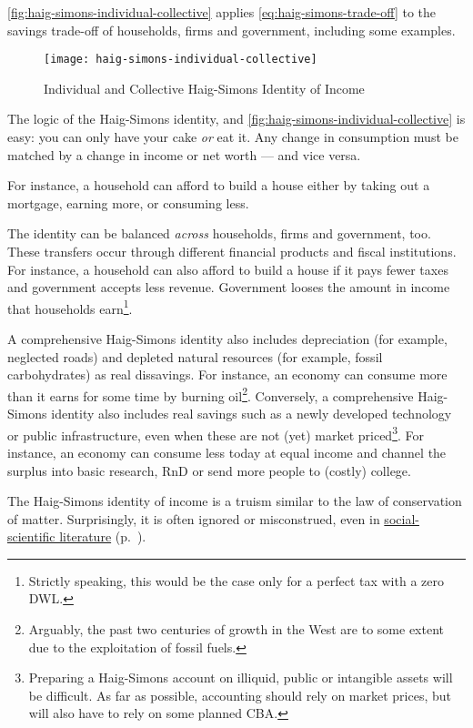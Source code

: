 \autoref{fig:haig-simons-individual-collective} applies \autoref{eq:haig-simons-trade-off} to the savings trade-off of households, firms and government, including some examples. 

\begin{figure}[htbp]
	\centering
	\texttt{[image: haig-simons-individual-collective]}  
	\caption{Individual and Collective Haig-Simons Identity of Income}
	\label{fig:haig-simons-individual-collective} %
\end{figure}

The logic of the Haig-Simons identity, and \autoref{fig:haig-simons-individual-collective} is easy: you can only have your cake \emph{or} eat it. Any change in consumption must be matched by a change in income or net worth --- and vice versa. 

For instance, a household can afford to build a house either by taking out a mortgage, earning more, or consuming less. 

The identity can be balanced \emph{across} households, firms and government, too. These transfers occur through different financial products and fiscal institutions. For instance, a household can also afford to build a house if it pays fewer taxes and government accepts less revenue. Government looses the amount in income that households earn\footnote{
	Strictly speaking, this would be the case only for a perfect tax with a zero \gls{DWL}.}. 

A comprehensive Haig-Simons identity also includes depreciation (for example, neglected roads) and depleted natural resources (for example, fossil carbohydrates) as real dissavings. For instance, an economy can consume more than it earns for some time by burning oil\footnote{
	Arguably, the past two centuries of growth in the West are to some extent due to the exploitation of fossil fuels.}. %
Conversely, a comprehensive Haig-Simons identity also includes real savings such as a newly developed technology or public infrastructure, even when these are not (yet) market priced\footnote{
	Preparing a Haig-Simons account on illiquid, public or intangible assets will be difficult. As far as possible, accounting should rely on market prices, but will also have to rely on  some planned \gls{CBA}.}. 
For instance, an economy can consume less today at equal income and channel the surplus into basic research, \gls{RnD} or send more people to (costly) college.

The Haig-Simons identity of income is a truism similar to the law of conservation of matter. Surprisingly, it is often ignored or misconstrued, even in \hyperref[sec:Literature]{social-scientific literature} (p.~\pageref{sec:Literature}). %

